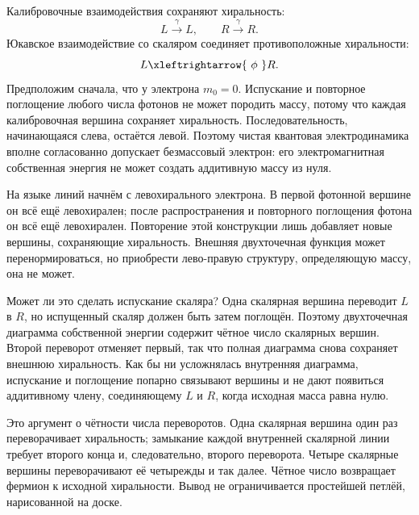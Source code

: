 Калибровочные взаимодействия сохраняют хиральность:
\begin{equation}
L\xrightarrow{\ \gamma\ }L,
\qquad
R\xrightarrow{\ \gamma\ }R.
\label{eq:gauge-preserves-chirality}
\end{equation}
Юкавское взаимодействие со скаляром соединяет противоположные хиральности:
\begin{equation}
L\xleftrightarrow{\ \phi\ }R.
\label{eq:scalar-flips-chirality}
\end{equation}
Предположим сначала, что у электрона \(m_0=0\). Испускание и повторное поглощение любого числа фотонов не может породить массу, потому что каждая калибровочная вершина сохраняет хиральность. Последовательность, начинающаяся слева, остаётся левой. Поэтому чистая квантовая электродинамика вполне согласованно допускает безмассовый электрон: его электромагнитная собственная энергия не может создать аддитивную массу из нуля.

На языке линий начнём с левохирального электрона. В первой фотонной вершине он всё ещё левохирален; после распространения и повторного поглощения фотона он всё ещё левохирален. Повторение этой конструкции лишь добавляет новые вершины, сохраняющие хиральность. Внешняя двухточечная функция может перенормироваться, но приобрести лево-правую структуру, определяющую массу, она не может.

Может ли это сделать испускание скаляра? Одна скалярная вершина переводит \(L\) в \(R\), но испущенный скаляр должен быть затем поглощён. Поэтому двухточечная диаграмма собственной энергии содержит чётное число скалярных вершин. Второй переворот отменяет первый, так что полная диаграмма снова сохраняет внешнюю хиральность. Как бы ни усложнялась внутренняя диаграмма, испускание и поглощение попарно связывают вершины и не дают появиться аддитивному члену, соединяющему \(L\) и \(R\), когда исходная масса равна нулю.

Это аргумент о чётности числа переворотов. Одна скалярная вершина один раз переворачивает хиральность; замыкание каждой внутренней скалярной линии требует второго конца и, следовательно, второго переворота. Четыре скалярные вершины переворачивают её четырежды и так далее. Чётное число возвращает фермион к исходной хиральности. Вывод не ограничивается простейшей петлёй, нарисованной на доске.

